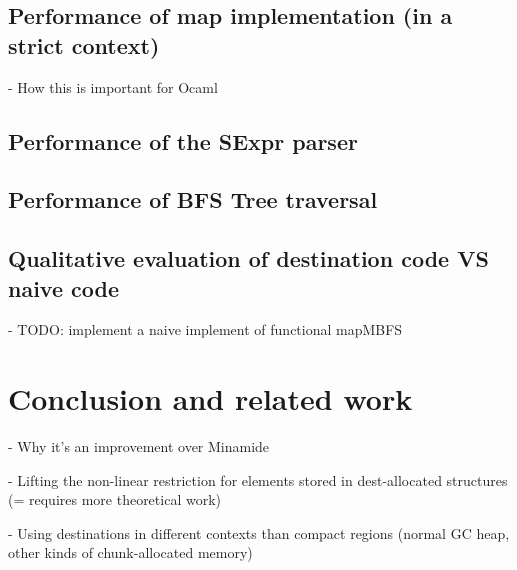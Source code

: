 \documentclass[english]{jflart}
\begin{document}
\subsection{Performance of map implementation (in a strict context)}

- How this is important for Ocaml

\subsection{Performance of the SExpr parser}

\subsection{Performance of BFS Tree traversal}

\subsection{Qualitative evaluation of destination code VS naive code}

- TODO: implement a naive implement of functional mapMBFS

\section{Conclusion and related work}

- Why it's an improvement over Minamide

- Lifting the non-linear restriction for elements stored in dest-allocated structures (= requires more theoretical work)

- Using destinations in different contexts than compact regions (normal GC heap, other kinds of chunk-allocated memory)

\printbibliography
\end{document}
